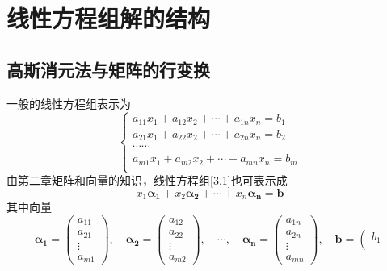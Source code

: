 \section{线性方程组解的结构}
\subsection{高斯消元法与矩阵的行变换}

\begin{definition}
    一般的线性方程组表示为
    \begin{equation}\label{3.1}\tag{3.1}
    \left\{\begin{array}{c}
    a_{11}x_{1}+a_{12}x_{2}+\cdots+a_{1n}x_n=b_1\\
    a_{21}x_{1}+a_{22}x_{2}+\cdots+a_{2n}x_n=b_2\\
    \cdots\cdots\\
    a_{m1}x_{1}+a_{m2}x_{2}+\cdots+a_{mn}x_n=b_m\\
    \end{array}\right.\end{equation}
    由第二章矩阵和向量的知识，线性方程组\eqref{3.1}也可表示成
    \begin{equation}\label{3.2}\tag{3.2}
        x_1\boldsymbol{\alpha_1}+x_2\boldsymbol{\alpha_2}+\cdots+x_n\boldsymbol{\alpha_n}=\boldsymbol{b}
    \end{equation}
    其中向量
    $$\boldsymbol{\alpha_1}=\left(\begin{array}{c}
        a_{11}\\
        a_{21}\\
        \vdots\\
        a_{m1}
    \end{array}\right),\quad
    \boldsymbol{\alpha_2}=\left(\begin{array}{c}
        a_{12}\\
        a_{22}\\
        \vdots\\
        a_{m2}
    \end{array}\right),\quad
    \cdots,\quad
    \boldsymbol{\alpha_n}=\left(\begin{array}{c}
        a_{1n}\\
        a_{2n}\\
        \vdots\\
        a_{mn}
    \end{array}\right),\quad
    \boldsymbol{b}=\left(\begin{array}{c}
        b_{1}\\

\end{array}$$
\end{definition}
